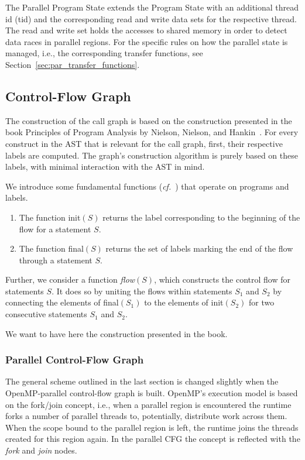 \documentclass[natbib]{article}
\begin{document}
The Parallel Program State extends the Program State with an additional thread id (tid) and the corresponding read and write data sets for the respective thread.
The read and write set holds the accesses to shared memory in order to detect data races in parallel regions.
For the specific rules on how the parallel state is managed, i.e., the corresponding transfer functions, see Section~\ref{sec:par_transfer_functions}.


\subsection{Control-Flow Graph}
The construction of the call graph is based on the construction presented in the book Principles of Program Analysis by Nielson, Nielson, and Hankin~\cite{NielsonNielson}.
For every construct in the AST that is relevant for the call graph, first, their respective labels are computed.
The graph's construction algorithm is purely based on these labels, with minimal interaction with the AST in mind.

We introduce some fundamental functions (\emph{cf.}~\cite{NielsonNielson}) that operate on programs and labels.
\begin{enumerate}
\item The function init$(S)$ returns the label corresponding to the beginning of the flow for a statement $S$.
\item The function final$(S)$ returns the set of labels marking the end of the flow through a statement $S$.
\end{enumerate}

Further, we consider a function \emph{flow}$(S)$, which constructs the control flow for statements $S$.
It does so by uniting the flows within statements $S_1$ and $S_2$ by connecting the elements of final$(S_1)$ to the elements of init$(S_2)$ for two consecutive statements $S_1$ and $S_2$.

We want to have here the construction presented in the book.

\subsubsection{Parallel Control-Flow Graph}
The general scheme outlined in the last section is changed slightly when the OpenMP-parallel control-flow graph is built.
OpenMP's execution model is based on the fork/join concept, i.e., when a parallel region is encountered the runtime forks a number of parallel threads to, potentially, distribute work across them.
When the scope bound to the parallel region is left, the runtime joins the threads created for this region again.
In the parallel CFG the concept is reflected with the \emph{fork} and \emph{join} nodes.
\end{document}
